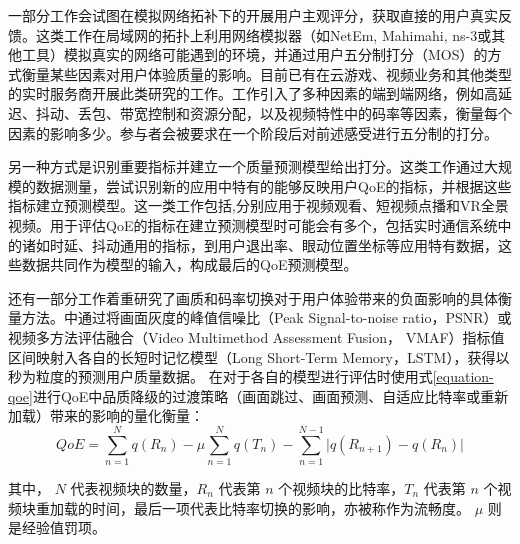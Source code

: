 一部分工作会试图在模拟网络拓补下的开展用户主观评分，获取直接的用户真实反馈。这类工作在局域网的拓扑上利用网络模拟器（如NetEm\cite{hemminger2005network}, Mahimahi\cite{netravali2015mahimahi}, ns-3\cite{henderson2008network}或其他工具）模拟真实的网络可能遇到的环境，并通过用户五分制打分（MOS）\cite{林闯2012用户体验质量}的方式衡量某些因素对用户体验质量的影响。目前已有在云游戏、视频业务和其他类型的实时服务商开展此类研究的工作\cite{jarschel2011evaluation,ahmad2023significance,zadtootaghaj2018modeling,zhang2019e2e,lindstrom2020cloud}。工作引入了多种因素的端到端网络，例如高延迟、抖动、丢包、带宽控制和资源分配，以及视频特性中的码率等因素，衡量每个因素的影响多少。参与者会被要求在一个阶段后对前述感受进行五分制的打分。

另一种方式是识别重要指标并建立一个质量预测模型给出打分。这类工作通过大规模的数据测量，尝试识别新的应用中特有的能够反映用户QoE的指标，并根据这些指标建立预测模型。这一类工作包括\cite{balachandran2013developing,cheng2023rebuffering,zhu2022eyeqoe},分别应用于视频观看、短视频点播和VR全景视频。用于评估QoE的指标在建立预测模型时可能会有多个，包括实时通信系统中的诸如时延、抖动通用的指标，到用户退出率、眼动位置坐标等应用特有数据，这些数据共同作为模型的输入，构成最后的QoE预测模型。

还有一部分工作着重研究了画质和码率切换对于用户体验带来的负面影响的具体衡量方法。\cite{slivar2016cloud,jamshidi2022deep,utke2022ndnetgaming}中通过将画面灰度的峰值信噪比（Peak Signal-to-noise ratio，PSNR）或视频多方法评估融合（Video Multimethod Assessment Fusion， VMAF）指标值区间映射入各自的长短时记忆模型（Long Short-Term Memory，LSTM），获得以秒为粒度的预测用户质量数据。
\cite{mao2017neural,huang2019comyco,nathan2019end}在对于各自的模型进行评估时使用式\eqref{equation-qoe}进行QoE中品质降级的过渡策略（画面跳过、画面预测、自适应比特率或重新加载）带来的影响的量化衡量：
\begin{equation}
    QoE = \sum_{n=1}^{N}q(R_n) - \mu \sum_{n=1}^{N}q(T_n) - \sum_{n=1}^{N-1}\lvert q(R_{n+1})-q(R_n) \rvert
\label{equation-qoe}
\end{equation}

其中， $N$ 代表视频块的数量，$R_n$ 代表第 $n$ 个视频块的比特率，$T_n$ 代表第 $n$ 个视频块重加载的时间，最后一项代表比特率切换的影响，亦被称作为流畅度。 $\mu$ 则是经验值罚项。


